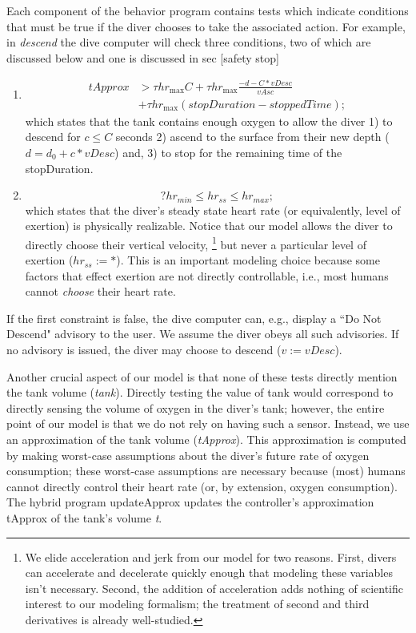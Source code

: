\documentclass[sigconf,screen]{acmart}
\newcommand{\varheart}{hr}
\newcommand{\vDesc}{\textit{vDesc}}
\newcommand{\vAsc}{\textit{vAsc}}
\newcommand{\tApprox}{\textit{tApprox}}
\newcommand{\iitimes}{{*}}
\begin{document}
Each component of the behavior program contains tests which indicate conditions that must be true if the diver chooses to take the associated action. For example, in \textit{descend} the dive computer will check three conditions, two of which are discussed below and one is discussed in sec [safety stop]

\begin{enumerate}
    \item 
        \begin{align*}
            \tApprox &>\tau \varheart_{\text{max}} C + \tau \varheart_{\text{max}}\frac{-d - C \iitimes \vDesc}{\vAsc} \\ &+ \tau \varheart_{\text{max}}(stopDuration - stoppedTime);
        \end{align*}
which states that the tank contains enough oxygen to allow the diver
1) to descend for $c \le C$ seconds
2) ascend to the surface from their new depth ($d = d_0 + c\iitimes\vDesc$) and,
3) to stop for the remaining time of the stopDuration.

    \item 
        $$?\varheart_{min} \le \varheart_{ss} \le \varheart_{max};$$
which states that the diver's steady state heart rate (or equivalently, level of exertion) is physically realizable. 
Notice that our model allows the diver to directly choose their vertical velocity,
\footnote[1]{We elide  acceleration and jerk from our model for two reasons.
First, divers can accelerate and decelerate quickly enough that modeling these variables isn't necessary. Second, the addition of acceleration adds nothing of scientific interest to our modeling formalism; the treatment of second and third derivatives is already well-studied.}
but never a particular level of exertion ($\varheart_{ss} := *$).
This is an important modeling choice because some factors
that effect exertion are not directly controllable, i.e., most humans cannot \emph{choose} their heart rate.
\end{enumerate}
If the first constraint is false, the dive computer can, e.g., display a ``Do Not Descend" advisory to the user.
We assume the diver obeys all such advisories. If no advisory is issued, the diver may choose to descend ($v := \vDesc$).

Another crucial aspect of our model is that none of these tests directly mention the tank volume (\textit{tank}). Directly testing the value of tank would correspond to directly sensing the volume of oxygen in the diver's tank; however, the entire point of our model is that we do not rely on having such a sensor. Instead, we use an approximation of the tank volume (\textit{tApprox}). This approximation is computed by making worst-case assumptions about the diver's future rate of oxygen consumption; these worst-case assumptions are necessary because (most) humans cannot directly control their heart rate (or, by extension, oxygen consumption). The hybrid program updateApprox updates the controller's approximation tApprox of the tank's volume \textit{t}.
\end{document}
